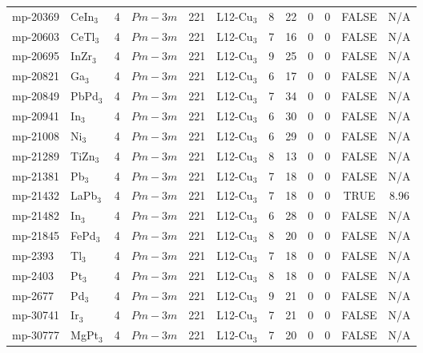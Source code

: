{\begin{longtable}{llcccccccccc}
    mp-20369 & CeIn$_{3}$ & 4     & $Pm-3m$ & 221   & L12-Cu$_{3}$ & 8     & 22    & 0     & 0     & FALSE & N/A \\
    mp-20603 & CeTl$_{3}$ & 4     & $Pm-3m$ & 221   & L12-Cu$_{3}$ & 7     & 16    & 0     & 0     & FALSE & N/A \\
    mp-20695 & InZr$_{3}$ & 4     & $Pm-3m$ & 221   & L12-Cu$_{3}$ & 9     & 25    & 0     & 0     & FALSE & N/A \\
    mp-20821 & Ga$_{3}$ & 4     & $Pm-3m$ & 221   & L12-Cu$_{3}$ & 6     & 17    & 0     & 0     & FALSE & N/A \\
    mp-20849 & PbPd$_{3}$ & 4     & $Pm-3m$ & 221   & L12-Cu$_{3}$ & 7     & 34    & 0     & 0     & FALSE & N/A \\
    mp-20941 & In$_{3}$ & 4     & $Pm-3m$ & 221   & L12-Cu$_{3}$ & 6     & 30    & 0     & 0     & FALSE & N/A \\
    mp-21008 & Ni$_{3}$ & 4     & $Pm-3m$ & 221   & L12-Cu$_{3}$ & 6     & 29    & 0     & 0     & FALSE & N/A \\
    mp-21289 & TiZn$_{3}$ & 4     & $Pm-3m$ & 221   & L12-Cu$_{3}$ & 8     & 13    & 0     & 0     & FALSE & N/A \\
    mp-21381 & Pb$_{3}$ & 4     & $Pm-3m$ & 221   & L12-Cu$_{3}$ & 7     & 18    & 0     & 0     & FALSE & N/A \\
    mp-21432 & LaPb$_{3}$ & 4     & $Pm-3m$ & 221   & L12-Cu$_{3}$ & 7     & 18    & 0     & 0     & TRUE  & 8.96  \\
    mp-21482 & In$_{3}$ & 4     & $Pm-3m$ & 221   & L12-Cu$_{3}$ & 6     & 28    & 0     & 0     & FALSE & N/A \\
    mp-21845 & FePd$_{3}$ & 4     & $Pm-3m$ & 221   & L12-Cu$_{3}$ & 8     & 20    & 0     & 0     & FALSE & N/A \\
    mp-2393 & Tl$_{3}$ & 4     & $Pm-3m$ & 221   & L12-Cu$_{3}$ & 7     & 18    & 0     & 0     & FALSE & N/A \\
    mp-2403 & Pt$_{3}$ & 4     & $Pm-3m$ & 221   & L12-Cu$_{3}$ & 8     & 18    & 0     & 0     & FALSE & N/A \\
    mp-2677 & Pd$_{3}$ & 4     & $Pm-3m$ & 221   & L12-Cu$_{3}$ & 9     & 21    & 0     & 0     & FALSE & N/A \\
    mp-30741 & Ir$_{3}$ & 4     & $Pm-3m$ & 221   & L12-Cu$_{3}$ & 7     & 21    & 0     & 0     & FALSE & N/A \\
    mp-30777 & MgPt$_{3}$ & 4     & $Pm-3m$ & 221   & L12-Cu$_{3}$ & 7     & 20    & 0     & 0     & FALSE & N/A \\

\end{longtable}}
